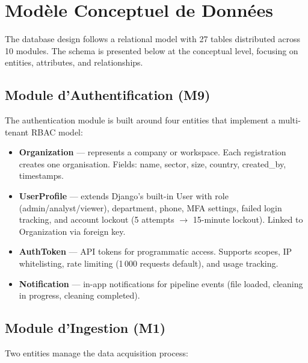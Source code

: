 \section{Modèle Conceptuel de Données}

\noindent
The database design follows a relational model
with 27 tables distributed across 10 modules.
The schema is presented below at the conceptual level,
focusing on entities, attributes, and relationships.

\subsection{Module d'Authentification (M9)}

\noindent
The authentication module is built around four entities
that implement a multi-tenant RBAC model:

\begin{itemize}
  \item \textbf{Organization} — represents a company
        or workspace. Each registration creates
        one organisation. Fields: name, sector, size,
        country, created\_by, timestamps.
  \item \textbf{UserProfile} — extends Django's built-in
        User with role (admin/analyst/viewer),
        department, phone, MFA settings,
        failed login tracking, and account lockout
        (5 attempts $\rightarrow$ 15-minute lockout).
        Linked to Organization via foreign key.
  \item \textbf{AuthToken} — API tokens for programmatic
        access. Supports scopes, IP whitelisting,
        rate limiting (1\,000 requests default),
        and usage tracking.
  \item \textbf{Notification} — in-app notifications
        for pipeline events (file loaded, cleaning
        in progress, cleaning completed).
\end{itemize}

\subsection{Module d'Ingestion (M1)}

\noindent
Two entities manage the data acquisition process:


